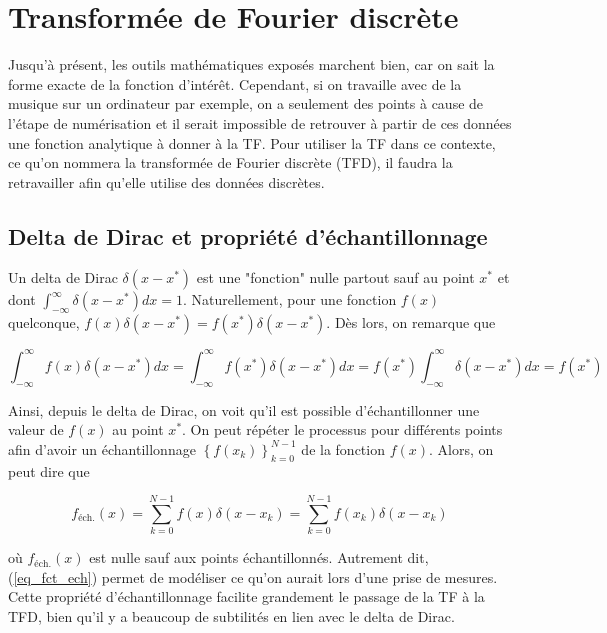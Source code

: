 \newpage
\section{Transformée de Fourier discrète}
Jusqu'à présent, les outils mathématiques exposés marchent bien, car on sait la forme exacte de la fonction d'intérêt. Cependant, si on travaille avec de la musique sur un ordinateur par exemple, on a seulement des points à cause de l'étape de numérisation et il serait impossible de retrouver à partir de ces données une fonction analytique à donner à la TF. Pour utiliser la TF dans ce contexte, ce qu'on nommera la transformée de Fourier discrète (TFD), il faudra la retravailler afin qu'elle utilise des données discrètes.

\subsection{Delta de Dirac et propriété d'échantillonnage}
Un delta de Dirac $\delta(x-x^*)$ est une "fonction" nulle partout sauf au point $x^*$ et dont $\int_{-\infty}^{\infty}\delta(x-x^*)dx = 1$. Naturellement, pour une fonction $f(x)$ quelconque, $f(x)\delta(x-x^*) = f(x^*)\delta(x-x^*)$. Dès lors, on remarque que 

\begin{equation*}
    \int_{-\infty}^{\infty}f(x)\delta(x-x^*)dx = \int_{-\infty}^{\infty}f(x^*)\delta(x-x^*)dx = f(x^*)\int_{-\infty}^{\infty}\delta(x-x^*)dx = f(x^*)  
\end{equation*}

Ainsi, depuis le delta de Dirac, on voit qu'il est possible d'échantillonner une valeur de $f(x)$ au point $x^*$. On peut répéter le processus pour différents points afin d'avoir un échantillonnage $\left\{f(x_k)\right\}_{k=0}^{N-1}$ de la fonction $f(x)$. Alors, on peut dire que

\begin{equation}
    f_{\text{éch.}}(x) = \sum_{k=0}^{N-1}f(x)\delta(x-x_k) = \sum_{k=0}^{N-1}f(x_k)\delta(x-x_k)
    \label{eq_fct_ech}
\end{equation}

où $f_{\text{éch.}}(x)$ est nulle sauf aux points échantillonnés. Autrement dit, (\ref{eq_fct_ech}) permet de modéliser ce qu'on aurait lors d'une prise de mesures. Cette propriété d'échantillonnage facilite grandement le passage de la TF à la TFD, bien qu'il y a beaucoup de subtilités en lien avec le delta de Dirac.


